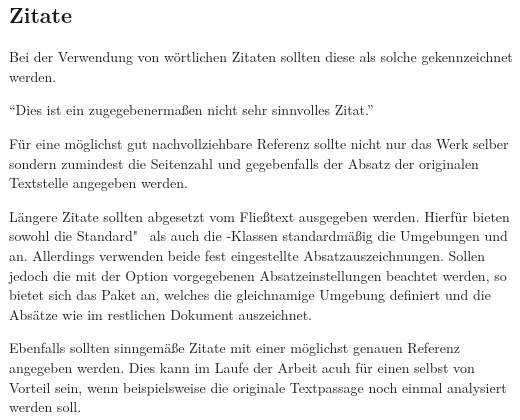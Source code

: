 \documentclass[%
  english,ngerman,%
  cdgeometry=no,DIV=12,automark,%
]{tudscrartcl}
\begin{document}
\begin{refsection}
\begin{Trunk+}
\section{Zitate}
Bei der Verwendung von wörtlichen Zitaten sollten diese als solche 
gekennzeichnet werden.
\end{Trunk+}
\begin{Trunk*}
\enquote{Dies ist ein zugegebenermaßen nicht sehr sinnvolles Zitat.}
\cite[58]{hanisch14}
\end{Trunk*}
\begin{Trunk+}
Für eine möglichst gut nachvollziehbare Referenz sollte nicht nur 
das Werk selber sondern zumindest die Seitenzahl und gegebenfalls 
der Absatz der originalen Textstelle angegeben werden. 
\end{Trunk+}
%
Längere Zitate sollten abgesetzt vom Fließtext ausgegeben werden. Hierfür 
bieten sowohl die Standard"~ als auch die \KOMAScript-Klassen standardmäßig 
die Umgebungen  und  an. Allerdings 
verwenden beide fest eingestellte Absatzauszeichnungen. Sollen jedoch die 
mit der Option  vorgegebenen Absatzeinstellungen beachtet 
werden, so bietet sich das Paket  an, welches die gleichnamige 
Umgebung definiert und die Absätze wie im restlichen Dokument auszeichnet.
%
\begin{Preamble}
\usepackage{quoting}

\end{Preamble}
%
\begin{Trunk*}
\end{Trunk*}
\begin{Trunk+}
Ebenfalls sollten sinngemäße Zitate mit einer möglichst genauen Referenz 
angegeben werden. Dies kann im Laufe der Arbeit acuh für einen selbst von 
Vorteil sein, wenn beispielsweise die originale Textpassage noch einmal 
analysiert werden soll.

\end{Trunk+}
\begin{quoting}[rightmargin=0pt]
\makeatletter
\let\markboth\@gobbletwo
\let\markright\@gobble
\makeatother
\vspace*{-\baselineskipglue}
\printbibliography
\end{quoting}
\end{refsection}
\end{document}
